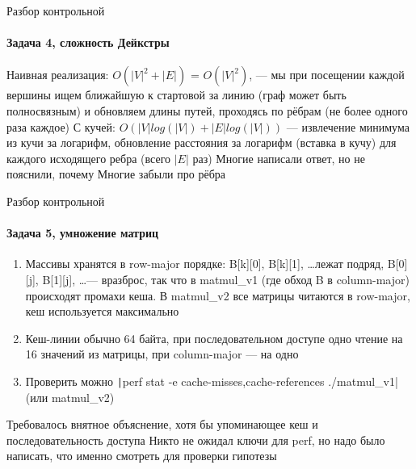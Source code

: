 \documentclass{../../slides-style}
\begin{document}
    \begin{frame}{Разбор контрольной}
        \framesubtitle{Задача 4, сложность Дейкстры}
        \begin{outline}
            \1 Наивная реализация: $O(|V|^2 + |E|)$ = $O(|V|^2)$, --- мы при посещении каждой вершины ищем ближайшую к стартовой за линию (граф может быть полносвязным) и обновляем длины путей, проходясь по рёбрам (не более одного раза каждое)
            \1 С кучей: $O(|V|log(|V|) + |E|log(|V|))$ --- извлечение минимума из кучи за логарифм, обновление расстояния за логарифм (вставка в кучу) для каждого исходящего ребра (всего $|E|$ раз)
            \1 Многие написали ответ, но не пояснили, почему
            \1 Многие забыли про рёбра
        \end{outline}
    \end{frame}

    \begin{frame}{Разбор контрольной}
        \framesubtitle{Задача 5, умножение матриц}
        \begin{enumerate}
            \item[a)] Массивы хранятся в row-major порядке: B[k][0], B[k][1], \dots лежат подряд, B[0][j], B[1][j], \dots --- вразброс, так что в matmul\_v1 (где обход B в column-major) происходят промахи кеша. В matmul\_v2 все матрицы читаются в row-major, кеш используется максимально
            \item[b)] Кеш-линии обычно 64 байта, при последовательном доступе одно чтение на 16 значений из матрицы, при column-major --- на одно
            \item[c)] Проверить можно \texttt|perf stat -e cache-misses,cache-references ./matmul_v1| (или matmul\_v2)
        \end{enumerate}
        \begin{outline}
            \1 Требовалось внятное объяснение, хотя бы упоминающее кеш и последовательность доступа
            \1 Никто не ожидал ключи для perf, но надо было написать, что именно смотреть для проверки гипотезы
        \end{outline}
    \end{frame}
\end{document}
